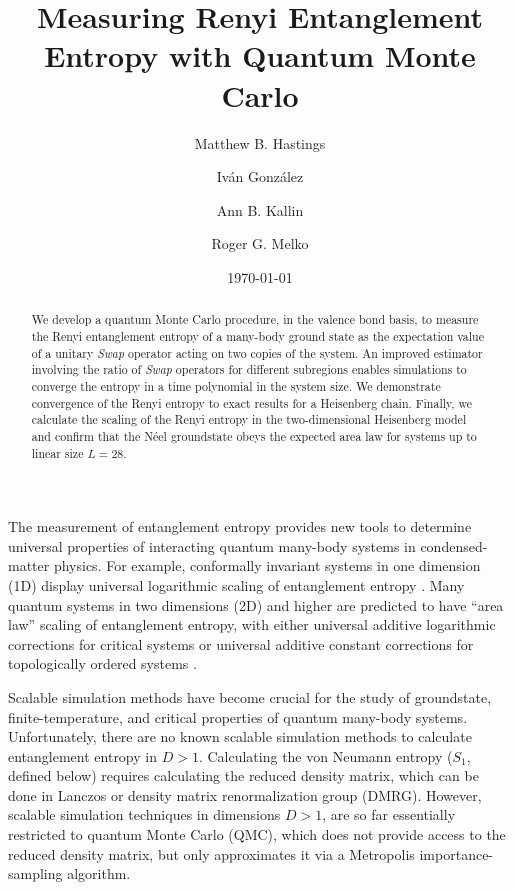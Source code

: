 \documentclass[prl,aps,twocolumn,floatfix,amsmath,amssymb,superscriptaddress,tightenlines]{revtex4}
\begin{document}
\date{\today}
\title{Measuring Renyi Entanglement Entropy with Quantum Monte Carlo}

\author{Matthew B. Hastings}

\author{Iv\'an Gonz\'alez}

\author{Ann B. Kallin}

\author{Roger G. Melko}

\begin{abstract} 


We develop a quantum Monte Carlo procedure, in the valence bond basis, to measure the Renyi entanglement entropy of a
many-body ground state as the expectation value of a unitary {\it Swap} operator acting on two copies of the system.
An improved estimator involving the ratio of {\it Swap} operators for different subregions enables simulations to converge the entropy in a time polynomial in the system size.  We demonstrate convergence of the Renyi entropy to exact results for a Heisenberg chain. Finally, we calculate the scaling of the Renyi entropy in the two-dimensional Heisenberg model and confirm that the N\'eel groundstate obeys the expected area law for systems up to linear size $L=28$.


\end{abstract}
\maketitle

The measurement of entanglement entropy  provides
new tools to determine universal properties of interacting quantum many-body systems in condensed-matter physics.  For example, conformally invariant
systems in one dimension (1D) display universal logarithmic
scaling of entanglement entropy \cite{Cardy}.  Many
quantum systems in two dimensions (2D) and higher are predicted to have ``area law''
scaling of entanglement entropy, with
either universal additive logarithmic corrections for critical systems \cite{corner,ryu} or
universal additive constant corrections for topologically ordered systems \cite{KP,LW}.

Scalable simulation methods have become crucial for the 
study of groundstate, finite-temperature, and critical properties of quantum
many-body systems.
Unfortunately, there are 
no known scalable simulation methods to calculate entanglement entropy in $D>1$.
Calculating the von Neumann entropy ($S_1$, defined below) requires calculating
the reduced density matrix,
which can be done in Lanczos 
or density matrix renormalization group (DMRG).  However, scalable simulation techniques in dimensions $D>1$,
are so far essentially
restricted to quantum Monte Carlo (QMC), which does not provide access to the reduced density matrix, but only approximates it
via a Metropolis importance-sampling algorithm. 
\end{document}
